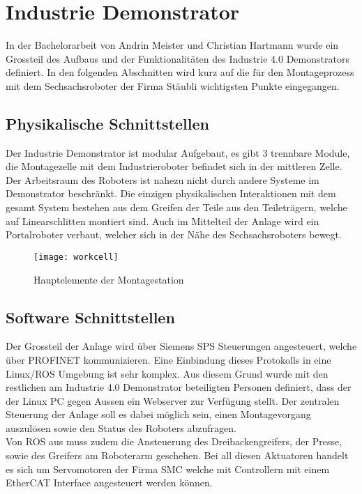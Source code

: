 \chapter{Industrie Demonstrator}
\label{sec:montageaufgabe}
In der Bachelorarbeit von Andrin Meister und Christian Hartmann wurde ein Grossteil des Aufbaus und der Funktionalitäten des Industrie 4.0 Demonstrators definiert. In den folgenden Abschnitten wird kurz auf die für den Montageprozess mit dem Sechsachsroboter der Firma Stäubli wichtigsten Punkte eingegangen. 

\section{Physikalische Schnittstellen}\label{sec:HWSchnittstellen}
Der Industrie Demonstrator ist modular Aufgebaut, es gibt 3 trennbare Module, die Montagezelle mit dem Industrieroboter befindet sich in der mittleren Zelle. Der Arbeitsraum des Roboters ist nahezu nicht durch andere Systeme im Demonstrator beschränkt. Die einzigen physikalischen Interaktionen mit dem gesamt System bestehen aus dem Greifen der Teile aus den Teileträgern, welche auf Linearschlitten montiert sind. Auch im Mittelteil der Anlage wird ein Portalroboter verbaut, welcher sich in der Nähe des Sechsachsroboters bewegt. 
\begin{figure}[h!]
	\centering
	\texttt{[image: workcell]}
	\caption[Hauptelemente der Montagestation]{Hauptelemente der Montagestation\cite{Hartmann2017}}
	\label{fig:workcell}
\end{figure}

\section{Software Schnittstellen}\label{sec:SWschnittstellen}
Der Grossteil der Anlage wird über Siemens SPS Steuerungen angesteuert, welche über PROFINET kommunizieren. Eine Einbindung dieses Protokolls in eine Linux/ROS Umgebung ist sehr komplex. Aus diesem Grund wurde mit den restlichen am Industrie 4.0 Demonstrator beteiligten Personen definiert, dass der der Linux PC gegen Aussen ein Webserver zur Verfügung stellt. Der zentralen Steuerung der Anlage soll es dabei möglich sein, einen Montagevorgang auszulösen sowie den Status des Roboters abzufragen. \\
Von ROS aus muss zudem die Ansteuerung des Dreibackengreifers, der Presse, sowie des Greifers am Roboterarm geschehen. Bei all diesen Aktuatoren handelt es sich um Servomotoren der Firma SMC welche mit Controllern mit einem EtherCAT Interface angesteuert werden können.

